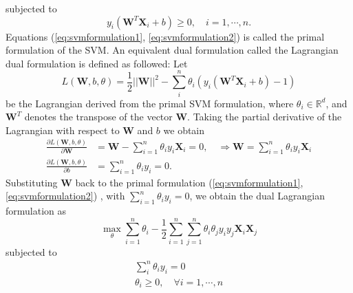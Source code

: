 \documentclass[../Main/thesis.tex]{subfiles}
\begin{document}
subjected to 
\begin{equation}\label{eq:svmformulation2}
y_{i}\left( \bm{W}^{T}\bm{X}_{i} + b \right) \geq 0, \quad i = 1,\cdots,n.
\end{equation}
Equations (\ref{eq:svmformulation1}, \ref{eq:svmformulation2}) is called the primal formulation of the SVM. An equivalent dual formulation called the Lagrangian dual formulation is defined as followed:
Let 
\begin{equation}\label{eq:svmprime1}
L(\bm{W}, b, \theta) = \frac{1}{2}||  \bm{W}||^{2} -\sum_{i}^{n}\theta_{i}\left(y_{i}\left( \bm{W}^{T}\bm{X}_{i} + b \right) -1  \right)
\end{equation}
be the Lagrangian derived from the primal SVM formulation, where $\theta_{i} \in \mathbb{R}^{d}$, and $\bm{W}^{T}$ denotes the transpose of the vector $\bm{W}$. Taking the partial derivative of the Lagrangian with respect to $\bm{W}$ and $b$ we obtain  
\begin{equation}\label{eq:dual1}
\begin{split}
\frac{\partial L(\bm{W}, b, \theta)}{\partial \bm{W}} &= \bm{W}-\sum_{i=1}^{n}\theta_{i}y_{i}\bm{X}_{i} = 0, \quad \Rightarrow \bm{W} = \sum_{i=1}^{n}\theta_{i}y_{i}\bm{X}_{i}\\
\frac{\partial L(\bm{W}, b, \theta)}{\partial b} &= \sum_{i=1}^{n}\theta_{i}y_{i} = 0.
\end{split}
\end{equation}
Substituting $\bm{W}$ back to the primal formulation (\ref{eq:svmformulation1}, \ref{eq:svmformulation2}) , with $ \sum_{i=1}^{n}\theta_{i}y_{i} = 0$, we obtain the dual Lagrangian formulation as 
\begin{equation}
\max_{\theta}\sum_{i=1}^{n}\theta_{i} - \frac{1}{2}\sum_{i=1}^{n}\sum_{j=1}^{n}\theta_{i}\theta_{j}y_{i}y_{j}\bm{X}_{i}\bm{X}_{j}
\end{equation}
subjected to 
\begin{equation}
\begin{split}
\sum_{i}^{n}\theta_{i}y_{i} = 0\\
\theta_{i} \geq 0, \quad \forall i = 1,\cdots,n
\end{split}
\end{equation}
\end{document}
